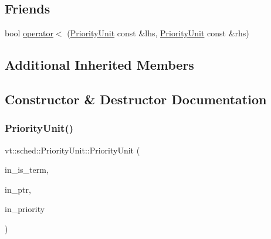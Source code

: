 \subsection*{Friends}
\begin{DoxyCompactItemize}
\item 
bool \hyperlink{structvt_1_1sched_1_1_priority_unit_acb3ebd4c059caed604579a0bbfb8b0e8}{operator$<$} (\hyperlink{structvt_1_1sched_1_1_priority_unit}{Priority\+Unit} const \&lhs, \hyperlink{structvt_1_1sched_1_1_priority_unit}{Priority\+Unit} const \&rhs)
\end{DoxyCompactItemize}
\subsection*{Additional Inherited Members}


\subsection{Constructor \& Destructor Documentation}
\mbox{\label{structvt_1_1sched_1_1_priority_unit_ae8a2706424c4e84db8be30fe59c21718}} 
\subsubsection{\texorpdfstring{Priority\+Unit()}{PriorityUnit()}\hspace{0.1cm}{\footnotesize\ttfamily [1/2]}}
{\footnotesize\ttfamily vt\+::sched\+::\+Priority\+Unit\+::\+Priority\+Unit (\begin{DoxyParamCaption}\item[{bool}]{in\+\_\+is\+\_\+term,  }\item[{\hyperlink{structvt_1_1sched_1_1_base_unit_ab635b72e57c53fa666d30bbfe5a0df17}{Runnable\+Ptr\+Type}}]{in\+\_\+ptr,  }\item[{\hyperlink{namespacevt_a86bff9f556eb761b27fc8600d006ac04}{Priority\+Type}}]{in\+\_\+priority }\end{DoxyParamCaption})\hspace{0.3cm}{\ttfamily [inline]}}

\mbox{\label{structvt_1_1sched_1_1_priority_unit_aeea5316b975f9c1bde33a5cc3dfb1631}} 
